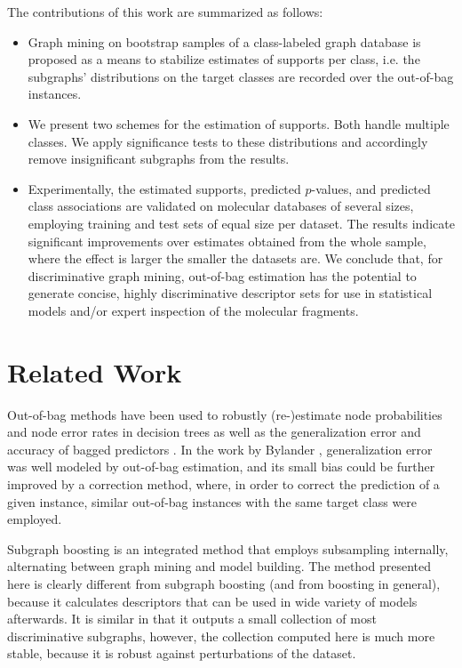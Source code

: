 \documentclass{article}
\begin{document}
The contributions of this work are summarized as follows:
\begin{itemize}
  \item Graph mining on bootstrap samples of a class-labeled graph database is
    proposed as a means to stabilize estimates of supports per class,
    i.e. the subgraphs' distributions on the target classes are recorded over
    the out-of-bag instances.  
  \item We present two schemes for the estimation of supports. Both handle
    multiple classes. We apply significance tests to these distributions and
    accordingly remove insignificant subgraphs from the results.  
  \item Experimentally, the estimated supports, predicted $p$-values, and
    predicted class associations are validated on molecular databases of
    several sizes, employing training and test sets of equal size per dataset.
    The results indicate significant improvements over estimates obtained from the
    whole sample, where the effect is larger the smaller the datasets are.  We
    conclude that, for discriminative graph mining, out-of-bag estimation has
    the potential to generate concise, highly discriminative descriptor sets
    for use in statistical models and/or expert inspection of the molecular fragments.
\end{itemize}


\section{Related Work}
\label{s:relatedWork}

Out-of-bag methods have been used to robustly (re-)estimate node probabilities
and node error rates in decision trees \cite{breiman96oob} as well as the
generalization error and accuracy of bagged predictors
\cite{bylander02estimating}. In the work by Bylander
\cite{bylander02estimating}, generalization error was well modeled by
out-of-bag estimation, and its small bias could be further improved by a correction method,
where, in order to correct the prediction of a given instance, similar
out-of-bag instances with the same target class were employed.

Subgraph boosting \cite{saigo09gboost} is an integrated method that employs
subsampling internally, alternating between graph mining and model building. The method presented here is
clearly different from subgraph boosting (and from boosting in general),
because it calculates descriptors that can be used in wide variety of models
afterwards. It is similar in that it outputs a small collection of most
discriminative subgraphs, however, the collection computed here is much more
stable, because it is robust against perturbations of the dataset.
\end{document}
